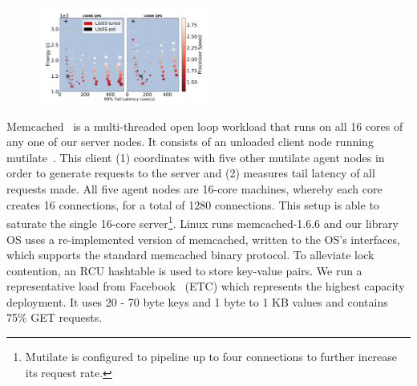 \begin{figure}
\includegraphics[width=0.5\textwidth]{figures/mcd_overview2}
\caption[]{}
\label{fig:mcd_overview2}
\vspace*{-.2in}
\end{figure}





Memcached~\cite{mcd} is a multi-threaded open loop workload that runs on all 16 cores of any one of our server nodes. It consists of an unloaded client node running mutilate~\cite{mutilate}. This client (1) coordinates with five other mutilate agent nodes in order to generate requests to the server and (2) measures tail latency of all requests made. All five agent nodes are 16-core machines, whereby each core creates 16 connections, for a total of 1280 connections. This setup is able to saturate the single 16-core server\footnote{Mutilate is configured to pipeline up to four connections to further increase its request rate.}. Linux runs memcached-1.6.6 and our library OS uses a re-implemented version of memcached, written to the OS's interfaces, which supports the standard memcached binary protocol. To alleviate lock contention, an RCU hashtable is used to store key-value pairs. We run a representative load from Facebook~\cite{workloadanalysisfacebook} (ETC) which represents the highest capacity deployment. It uses 20 - 70 byte keys and 1 byte to 1 KB values and contains 75\% GET requests.

